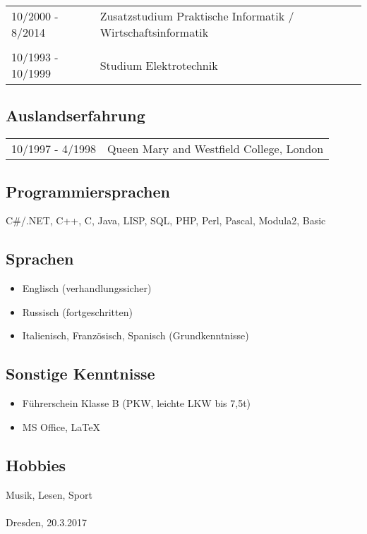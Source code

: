 \documentclass{article}
\begin{document}
\begin{tabular}{lp{15cm}}
10/2000 - 8/2014	& Zusatzstudium Praktische Informatik / Wirtschaftsinformatik\\
\\
10/1993 - 10/1999	& Studium Elektrotechnik\\
\end{tabular}


\subsection*{Auslandserfahrung}
  \begin{tabular}{lp{15cm}}
    10/1997 - 4/1998	& Queen Mary and Westfield College, London
  \end{tabular}
	
\subsection*{Programmiersprachen}
  C\#/.NET, C++, C, Java, LISP, SQL, PHP, Perl, Pascal, Modula2, Basic
		
\subsection*{Sprachen}
  \begin{itemize}
    \item{Englisch (verhandlungssicher)}
    \item{Russisch (fortgeschritten)}
    \item{Italienisch, Französisch, Spanisch (Grundkenntnisse)}
  \end{itemize}

\subsection*{Sonstige Kenntnisse}
  \begin{itemize}
    \item{F\"uhrerschein Klasse B (PKW, leichte LKW bis 7,5t)}
    \item{MS Office, \LaTeX{}}
  \end{itemize}

\subsection*{Hobbies}
Musik, Lesen, Sport\\
\\
Dresden, 20.3.2017
\end{document}
